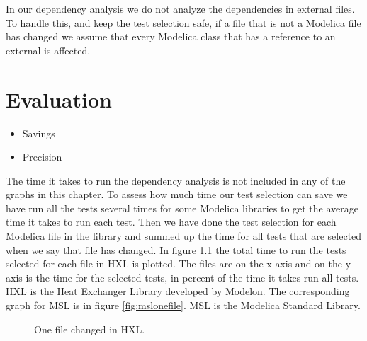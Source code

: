 \documentclass{cslthse-msc}
\begin{document}
In our dependency analysis we do not analyze the dependencies in external files. To handle this, and keep the test selection safe, if a file that is not a Modelica file has changed we assume that every Modelica class that has a reference to an external is affected.
\chapter[Evaluation]{Evaluation}
\begin{itemize}
	\item Savings
	\item Precision
\end{itemize}
The time it takes to run the dependency analysis is not included in any of the graphs in this chapter.
To assess how much time our test selection can save we have run all the tests several times for some Modelica libraries to get the average time it takes to run each test. Then we have done the test selection for each Modelica file in the library and summed up the time for all tests that are selected when we say that file has changed. In figure \ref{fig:hxlonefile} the total time to run the tests selected for each file in HXL is plotted. The files are on the x-axis and on the y-axis is the time for the selected tests, in percent of the time it takes run all tests. HXL is the Heat Exchanger Library developed by Modelon. The corresponding graph for MSL is in figure \ref{fig:mslonefile}. MSL is the Modelica Standard Library.


\begin{figure}
    \centering
    \caption{One file changed in HXL.}
    \label{fig:hxlonefile}
\end{figure}
\end{document}
